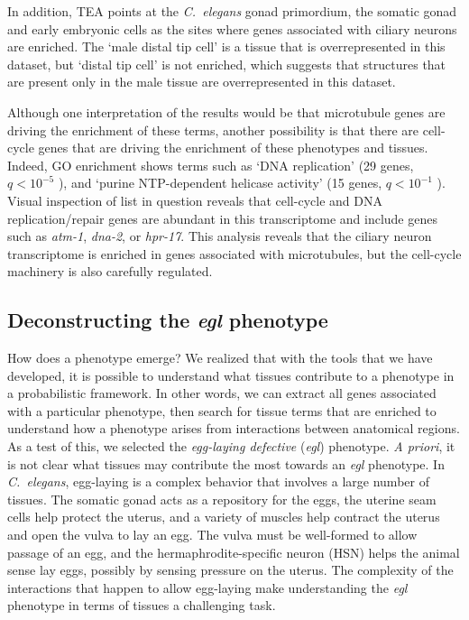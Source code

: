 \documentclass[10pt,letterpaper,twocolumn]{article}
\newcommand{\cel}{\emph{C.~elegans}}
\newcommand{\qval}[1]{
                      \ensuremath{
                                  q<10^{-#1}
                                  }
                      }
\begin{document}
In addition, TEA points at the \cel{} gonad primordium, the somatic gonad
and early embryonic cells as the sites where genes associated with ciliary neurons
are enriched. The `male distal tip cell' is a tissue
that is overrepresented in this dataset, but `distal tip cell' is not enriched,
which suggests that structures that are present only in the male tissue are
overrepresented in this dataset.

Although one interpretation of the results would be that microtubule genes
are driving the enrichment of these terms, another possibility is that
there are cell-cycle genes that are driving the enrichment of these phenotypes
and tissues. Indeed, GO enrichment shows terms such as `DNA replication' (29
genes, \qval{5}), and `purine NTP-dependent helicase activity'
(15 genes, \qval{1}). Visual inspection of list in question reveals that
cell-cycle and DNA replication/repair genes are abundant in this transcriptome
and include genes such as \emph{atm-1}, \emph{dna-2}, or \emph{hpr-17}. This
analysis reveals that the ciliary neuron transcriptome is enriched in
genes associated with microtubules, but the cell-cycle machinery is also
carefully regulated.

\subsection*{Deconstructing the \emph{egl} phenotype}
How does a phenotype emerge? We realized that with the tools that we have
developed, it is possible to understand what tissues contribute to a phenotype
in a probabilistic framework. In other words, we can extract all genes associated
with a particular phenotype, then search for tissue terms that are enriched to
understand how a phenotype arises from interactions between anatomical regions.
As a test of this, we selected the \emph{egg-laying defective} (\emph{egl}) phenotype.
\emph{A priori}, it is not clear what tissues may contribute the most towards
an \emph{egl} phenotype. In \cel{}, egg-laying is a complex behavior that involves
a large number of tissues. The somatic gonad acts as a repository for the eggs,
the uterine seam cells help protect the uterus, and a variety of muscles help
contract the uterus and open the vulva to lay an egg. The vulva must be well-formed
to allow passage of an egg, and the hermaphrodite-specific neuron (HSN) helps the
animal sense lay eggs, possibly by sensing pressure on the uterus. The
complexity of the interactions that happen to allow egg-laying make understanding
the \emph{egl} phenotype in terms of tissues a challenging task.
\end{document}
